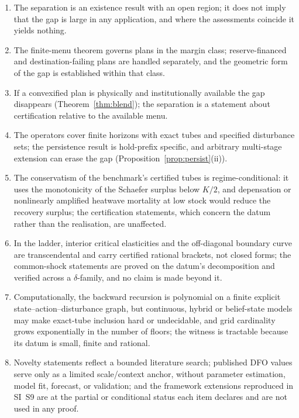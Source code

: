 \begin{enumerate}[label=(\roman*),leftmargin=2em]
\item The separation is an existence result with an open region; it does not imply that the gap is large in any application, and where the assessments coincide it yields nothing.
\item The finite-menu theorem governs plans in the margin class; reserve-financed and destination-failing plans are handled separately, and the geometric form of the gap is established within that class.
\item If a convexified plan is physically and institutionally available the gap disappears (Theorem~\ref{thm:blend}); the separation is a statement about certification relative to the available menu.
\item The operators cover finite horizons with exact tubes and specified disturbance sets; the persistence result is hold-prefix specific, and arbitrary multi-stage extension can erase the gap (Proposition~\ref{prop:persist}(ii)).
\item The conservatism of the benchmark's certified tubes is regime-conditional: it uses the monotonicity of the Schaefer surplus below $K/2$, and depensation or nonlinearly amplified heatwave mortality at low stock would reduce the recovery surplus; the certification statements, which concern the datum rather than the realisation, are unaffected.
\item In the ladder, interior critical elasticities and the off-diagonal boundary curve are transcendental and carry certified rational brackets, not closed forms; the common-shock statements are proved on the datum's decomposition and verified across a $\delta$-family, and no claim is made beyond it.
\item Computationally, the backward recursion is polynomial on a finite explicit state--action--disturbance graph, but continuous, hybrid or belief-state models may make exact-tube inclusion hard or undecidable, and grid cardinality grows exponentially in the number of floors; the witness is tractable because its datum is small, finite and rational.
\item Novelty statements reflect a bounded literature search; published DFO values serve only as a limited scale/context anchor, without parameter estimation, model fit, forecast, or validation; and the framework extensions reproduced in SI~S9 are at the partial or conditional status each item declares and are not used in any proof.
\end{enumerate}

